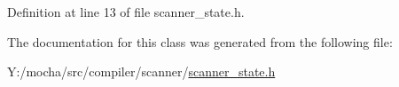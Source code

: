 Definition at line 13 of file scanner\_\-state.h.



The documentation for this class was generated from the following file:\begin{DoxyCompactItemize}
\item 
Y:/mocha/src/compiler/scanner/\hyperlink{scanner__state_8h}{scanner\_\-state.h}\end{DoxyCompactItemize}
